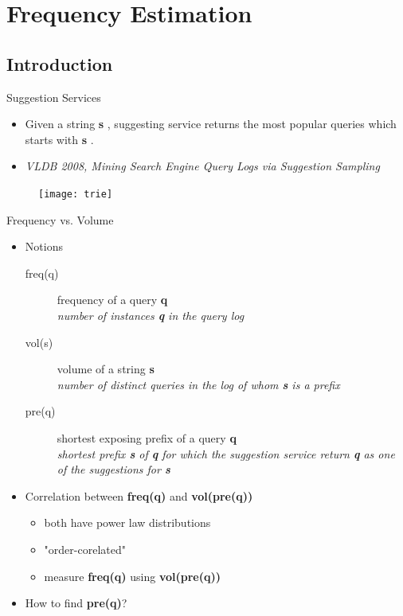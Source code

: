 \documentclass{beamer}
\newcommand{\query}{\textbf{q} }
\newcommand{\str}{\textbf{s} }
\begin{document}
\section{Frequency Estimation}
    \subsection{Introduction}
    \begin{frame}{Suggestion Services}
        \begin{itemize}
        \item Given a string \str, suggesting service returns the most popular queries which starts with \str.
        \item \em{VLDB 2008, Mining Search Engine Query Logs via Suggestion Sampling}
        \end{itemize}
        \begin{figure}
        \texttt{[image: trie]}
        \end{figure}
    \end{frame}

    \begin{frame}{Frequency vs. Volume}
        \begin{itemize}
        \item Notions
            \begin{description}
            \item [freq(q)] frequency of a query \query \\
                \em{number of instances \query in the query log}
            \item [vol(s)] volume of a string \str  \\
                \em{number of distinct queries in the log of whom \str is a prefix}
            \item [pre(q)] shortest exposing prefix of a query \query  \\
                \em{shortest prefix \str of \query for which the suggestion service return \query as one of the suggestions for \str}
            \end{description}
        \item Correlation between \textbf{freq(q)} and \textbf{vol(pre(q))}
            \begin{itemize}
            \item both have power law distributions
            \item "order-corelated"
            \item measure \textbf{freq(q)} using \textbf{vol(pre(q))}
            \end{itemize}
        \item How to find \textbf{pre(q)}?
        \end{itemize}
    \end{frame}
\end{document}
